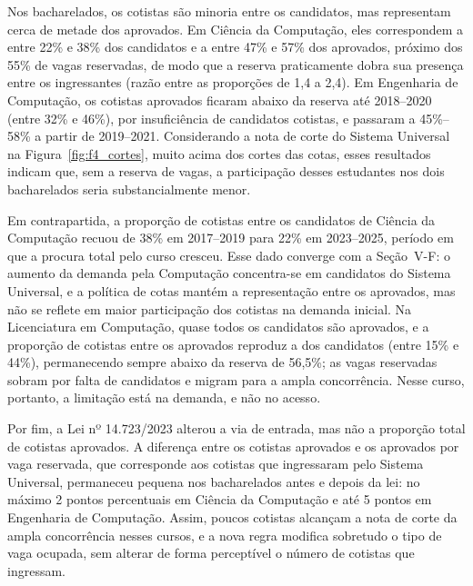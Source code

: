 Nos bacharelados, os cotistas são minoria entre os candidatos, mas representam cerca de metade dos aprovados. Em Ciência da Computação, eles correspondem a entre 22\% e 38\% dos candidatos e a entre 47\% e 57\% dos aprovados, próximo dos 55\% de vagas reservadas, de modo que a reserva praticamente dobra sua presença entre os ingressantes (razão entre as proporções de 1,4 a 2,4). Em Engenharia de Computação, os cotistas aprovados ficaram abaixo da reserva até 2018--2020 (entre 32\% e 46\%), por insuficiência de candidatos cotistas, e passaram a 45\%--58\% a partir de 2019--2021. Considerando a nota de corte do Sistema Universal na Figura~\ref{fig:f4_cortes}, muito acima dos cortes das cotas, esses resultados indicam que, sem a reserva de vagas, a participação desses estudantes nos dois bacharelados seria substancialmente menor.

Em contrapartida, a proporção de cotistas entre os candidatos de Ciência da Computação recuou de 38\% em 2017--2019 para 22\% em 2023--2025, período em que a procura total pelo curso cresceu. Esse dado converge com a Seção~V-F: o aumento da demanda pela Computação concentra-se em candidatos do Sistema Universal, e a política de cotas mantém a representação entre os aprovados, mas não se reflete em maior participação dos cotistas na demanda inicial. Na Licenciatura em Computação, quase todos os candidatos são aprovados, e a proporção de cotistas entre os aprovados reproduz a dos candidatos (entre 15\% e 44\%), permanecendo sempre abaixo da reserva de 56,5\%; as vagas reservadas sobram por falta de candidatos e migram para a ampla concorrência. Nesse curso, portanto, a limitação está na demanda, e não no acesso.

Por fim, a Lei nº 14.723/2023 alterou a via de entrada, mas não a proporção total de cotistas aprovados. A diferença entre os cotistas aprovados e os aprovados por vaga reservada, que corresponde aos cotistas que ingressaram pelo Sistema Universal, permaneceu pequena nos bacharelados antes e depois da lei: no máximo 2 pontos percentuais em Ciência da Computação e até 5 pontos em Engenharia de Computação. Assim, poucos cotistas alcançam a nota de corte da ampla concorrência nesses cursos, e a nova regra modifica sobretudo o tipo de vaga ocupada, sem alterar de forma perceptível o número de cotistas que ingressam.
